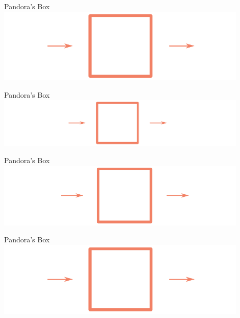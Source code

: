     \begin{frame}{Pandora's Box}
        \centering
        \includegraphics[width = 0.9\textwidth]{images/fourier-1.pdf}
    \end{frame}
    
    \begin{frame}{Pandora's Box}
        \centering
        \includegraphics[width = 0.9\textwidth]{images/fourier-2.pdf}
    \end{frame}
    
    \begin{frame}{Pandora's Box}
        \centering
        \includegraphics[width = 0.9\textwidth]{images/fourier-3.pdf}
    \end{frame}
    
    \begin{frame}{Pandora's Box}
        \centering
        \includegraphics[width = 0.9\textwidth]{images/fourier-4.pdf}
    \end{frame}
    
